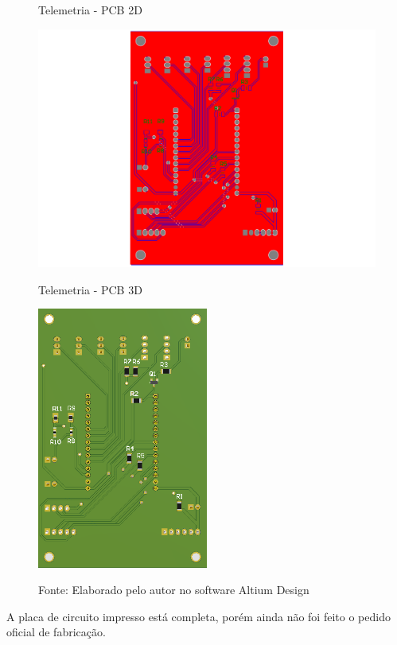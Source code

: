 \documentclass[../poliXuniversity_hospital_-USP-report.tex]{subfiles}
\begin{document}
\begin{figure}[!h]
    \centering
    \begin{minipage}{0.5\textwidth}
        \centering
        \caption{Telemetria - PCB 2D}
        \includegraphics[width=1.03\textwidth]{modulos/Telemetria_Oficial-5.png} 
        \label{fig:figura1minipg}
    \end{minipage}\hfill
    \begin{minipage}{0.5\textwidth}
        \centering
        \caption{Telemetria - PCB 3D}
        \includegraphics[width=0.5\textwidth]{modulos/Telemetria_Oficial.png} 
        \label{fig:figura1minipg}
    \end{minipage}\hfill
    
    \caption*{Fonte: Elaborado pelo autor no software Altium Design\cite{altium21} }
    \label{fig:figurasminipg}
\end{figure}

A placa de circuito impresso está completa, porém ainda não foi feito o pedido oficial de fabricação.

\end{document}
